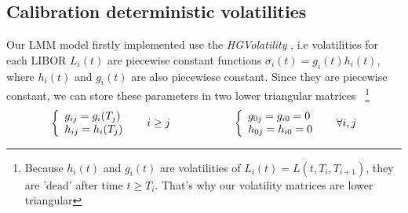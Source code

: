 \documentclass[a4paper,10pt]{article}
\begin{document}
\subsection{Calibration deterministic volatilities}
Our LMM model firstly implemented use the \textit{HGVolatility} , i.e volatilities for each LIBOR $L_i(t)$ are piecewise constant functions $\sigma_i(t)=g_i(t)h_i(t)$, where $h_i(t)$ and $g_i(t)$ are also piecewiese constant. Since they are piecewise constant, we can store these parameters in two lower triangular matrices ~\footnote{ Because $h_i(t)$ and $g_i(t)$ are volatilities of $L_i(t)=L(t,T_i,T_{i+1}) $, they are 'dead' after time $t \geq T_i$. That's why our volatility matrices are lower triangular}
\[
\left\{
\begin{array}{l}
g_{ij}= g_i(T_j) \\
h_{ij}= h_i(T_j)
\end{array}
\right.
\hspace{0.5cm}
i \geq j
\hspace{2cm}
\left\{
\begin{array}{l}
g_{0j}=g_{i0}=0 \\
h_{0j}=h_{i0}=0
\end{array}
\right.
\hspace{0.5cm}
\forall i,j
\]
\end{document}
